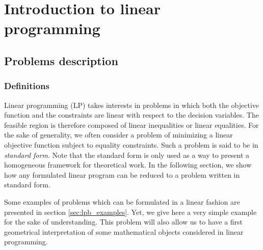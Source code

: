 \chapter{Introduction to linear programming}

\section{Problems description}

\subsection{Definitions}
Linear programming (LP) takes interests in problems in which both the objective function and the constraints are linear with respect to the decision variables. The feasible region is therefore composed of linear inequalities or linear equalities. For the sake of generality, we often consider a problem of minimizing a linear objective function subject to equality constraints. Such a problem is said to be in \textit{standard form}. Note that the standard form is only used as a way to present a homogeneous framework for theoretical work. In the following section, we show how any formulated linear program can be reduced to a problem written in standard form.

Some examples of problems which can be formulated in a linear fashion are presented in section \ref{sec:lpb_examples}. Yet, we give here a very simple example for the sake of understanding. This problem will also allow us to have a first geometrical interpretation of some mathematical objects considered in linear programming. 


